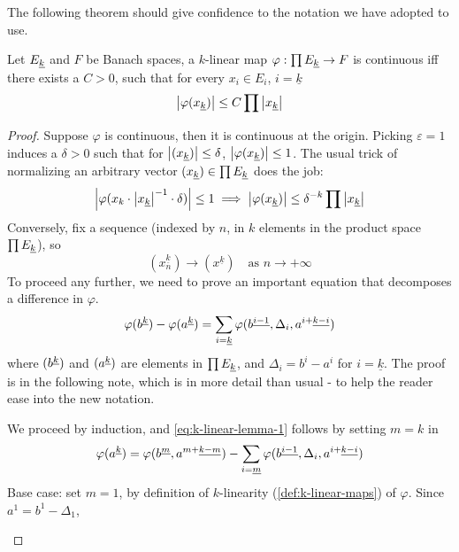 \documentclass[../main-manifolds.tex]{subfiles}
\begin{document}

The following theorem should give confidence to the notation we have adopted to use.
\begin{wts}
    Let $\UL{E}[k]$ and $F$ be Banach spaces, a $k$-linear map $\varphi: \prod \UL{E}[k]\to F$ is continuous iff there exists a $C>0$, such that for every $x_i\in E_i$, $i=\underline{k}$
    \[
        \abs{\varphi(\UL{x}[k])} \leq C\prod \abs{\UL{x}[k]}
    \]
\end{wts}
\begin{proof}
    Suppose $\varphi$ is continuous, then it is continuous at the origin. Picking $\varepsilon = 1$ induces a $\delta>0$ such that for $\abs{(\UL{x}[k])}\leq \delta$, $\abs{\varphi(\UL{x}[k])}\leq 1$. The usual trick of normalizing an arbitrary vector $(\UL{x}[k])\in \prod \UL{E}[k]$ does the job:
    \[
        \abs{\varphi(x_k\cdot \abs{\UL{x}[k]}^{-1}\cdot\delta)}\leq 1\implies \abs{\varphi(\UL{x}[k])}\leq \delta^{-k}\prod\abs{\UL{x}[k]}
    \]
    Conversely, fix a sequence (indexed by $n$, in $k$ elements in the product space $\prod\UL{E}[k]$), so
    \begin{equation}\label{eq:k-linear-sequence-def}
        (x_n^{\underline{k}})\to (x^{\underline{k}})\quad \text{as } n\to +\infty
    \end{equation}
    To proceed any further, we need to prove an important equation that decomposes a difference in $\varphi$.
    \begin{equation}\label{eq:k-linear-lemma-1}
        \varphi(\UPL{b}[k]) - \varphi(\UPL{a}[k]) = \sum_{i=\underline{k}}\varphi(\UPL{b}[i-1],\Delta_i, \UPL{a}[i+][k-i])
    \end{equation}
    where $(\UPL{b}[k])$ and $(\UPL{a}[k])$ are elements in $\prod \UL{E}[k]$, and $\Delta_i = b^i - a^i$ for $i = \underline{k}$. The proof is in the following note, which is in more detail than usual - to help the reader ease into the new notation.
    \begin{note}
        We proceed by induction, and \cref{eq:k-linear-lemma-1} follows by setting $m=k$ in
        \begin{equation}\label{eq:k-linear-lemma-2}
            \varphi(\UPL{a}[k]) = \varphi(\UPL{b}[m],\UPL{a}[m+][k-m]) - \sum_{i=\underline{m}}\varphi(\UPL{b}[i-1],\Delta_i,\UPL{a}[i+][k-i])
        \end{equation}
        Base case: set $m=1$, by definition of $k$-linearity (\cref{def:k-linear-maps}) of $\varphi$. Since $a^1 = b^1-\Delta_1$, 
        \[
\]
\end{note}
\end{proof}
\end{document}
